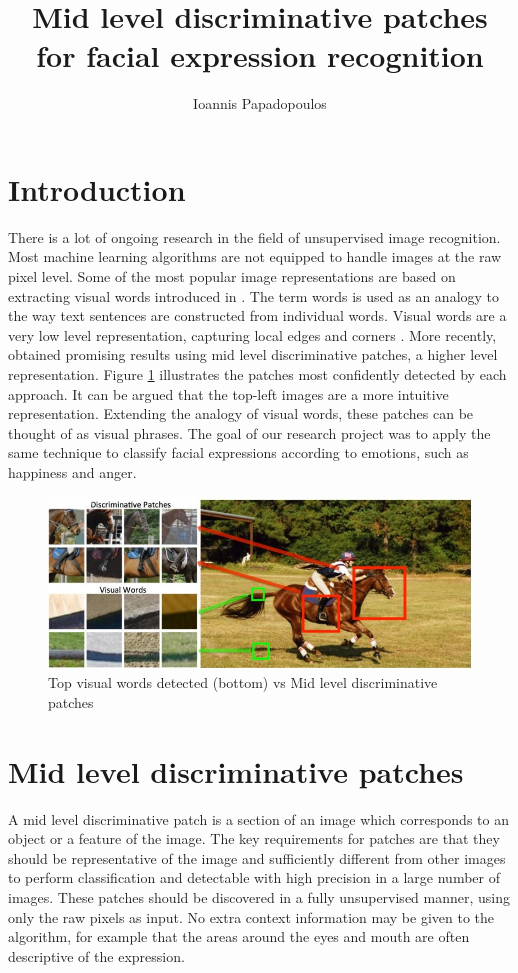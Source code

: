 \documentclass{article}
\title{Mid level discriminative patches for facial expression recognition}
\author{Ioannis Papadopoulos }
\begin{document}
\maketitle

\setlength\parindent{0pt}

\section{Introduction}
There is a lot of ongoing research in the field of unsupervised image recognition. Most machine learning algorithms are not equipped to handle images at the raw pixel level. Some of the most popular image representations are based on extracting visual words introduced in \cite{words}. The term words is used as an analogy to the way text sentences are constructed from individual words. Visual words are a very low level representation, capturing local edges and corners \cite{mode}. 
\newline \newline
More recently, \cite{paris} obtained promising results using  mid level discriminative patches, a higher level representation. Figure \ref{fig:comparison} illustrates the patches most confidently detected by each approach. It can be argued that the top-left images are a more intuitive representation. Extending the analogy of visual words, these patches can be thought of as visual phrases. The goal of our research project was to apply the same technique to classify facial expressions according to emotions, such as happiness and anger.

\begin{figure}
\includegraphics[width=400pt]{patches.jpg}
  \caption{Top visual words detected (bottom) vs Mid level discriminative patches}
  \label{fig:comparison}
\end{figure}

\section{Mid level discriminative patches}
A mid level discriminative patch is a section of an image which corresponds to an object or a feature of the image. The key requirements for patches are that they should be representative of the image and sufficiently different from other images to perform classification and detectable with high precision in a large number of images. These patches should be discovered in a fully unsupervised manner, using only the raw pixels as input. No extra context information may be given to the algorithm, for example that the areas around the eyes and mouth are often descriptive of the expression. 
\end{document}
